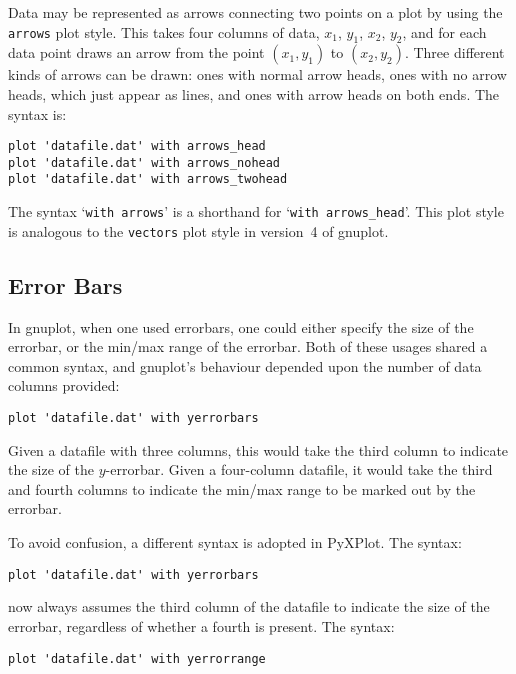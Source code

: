 Data may be represented as arrows connecting two points on a plot by using the
{\tt arrows} plot style.
This takes four columns of data, $x_1$, $y_1$, $x_2$, $y_2$, and for each data
point draws an arrow from the point $(x_1,y_1)$ to $(x_2,y_2)$.  Three
different kinds of arrows can be drawn: ones with normal arrow heads, ones with
no arrow heads, which just appear as lines, and ones with arrow heads on both
ends. The syntax is:

\begin{verbatim}
plot 'datafile.dat' with arrows_head
plot 'datafile.dat' with arrows_nohead
plot 'datafile.dat' with arrows_twohead
\end{verbatim}

The syntax `\texttt{with arrows}' is a shorthand for `\texttt{with
arrows\_head}'. This plot style is analogous to the {\tt vectors} plot style in
version~4 of gnuplot.

\subsection{Error Bars}

\label{errorbars}
In gnuplot, when one used errorbars, one could either specify the size of the
errorbar, or the min/max range of the errorbar. Both of these usages shared a
common syntax, and gnuplot's behaviour depended upon the number of data columns
provided:

\begin{verbatim}
plot 'datafile.dat' with yerrorbars
\end{verbatim}

\noindent Given a datafile with three columns, this would take the third column
to indicate the size of the $y$-errorbar. Given a four-column datafile, it
would take the third and fourth columns to indicate the min/max range to be
marked out by the errorbar.

To avoid confusion, a different syntax is adopted in PyXPlot. The syntax:

\begin{verbatim}
plot 'datafile.dat' with yerrorbars
\end{verbatim}

\noindent now always assumes the third column of the datafile to indicate the
size of the errorbar, regardless of whether a fourth is present. The syntax:

\begin{verbatim}
plot 'datafile.dat' with yerrorrange
\end{verbatim}

